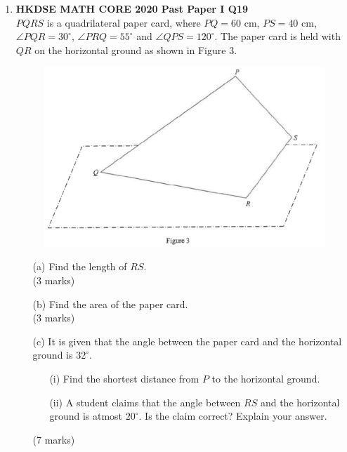 \documentclass[12pt]{article}
\begin{document}
\begin{enumerate}
	\item \textbf{HKDSE MATH CORE 2020 Past Paper I Q19}\\
	$PQRS$ is a quadrilateral paper card, where $PQ = 60$ cm, $PS = 40$ cm, $\angle PQR = 30^\circ$, $\angle PRQ = 55^\circ$ and $\angle QPS = 120^\circ$. The paper card is held with $QR$ on the horizontal ground as shown in Figure 3.	
	\begin{figure}[H]
		\centering
		\includegraphics[width = .3\linewidth]{2020Figure1.3}
	\end{figure}
	\begin{enumerate}
		\item[(a)] Find the length of $RS$. \\(3 marks)
		\item[(b)] Find the area of the paper card. \\(3 marks)
		\item[(c)] It is given that the angle between the paper card and the horizontal ground is $32^\circ$.
		\begin{enumerate}
			\item[(i)] Find the shortest distance from $P$ to the horizontal ground.
			\item[(ii)] A student claims that the angle between $RS$ and the horizontal ground is atmost $20^\circ$. Is the claim correct? Explain your answer.
		\end{enumerate}
		(7 marks)
	\end{enumerate}


\end{enumerate}
\end{document}
